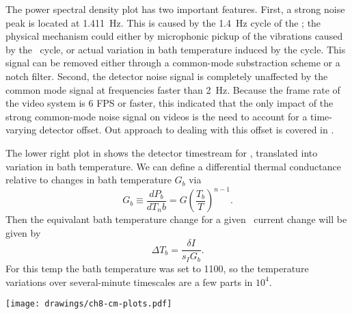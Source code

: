 The power spectral density plot has two important features.
First, a strong noise peak is located at \SI{1.411}{\Hz}.
This is caused by the \abt \SI{1.4}{\Hz} cycle of the \PTC; the physical mechanism could either by microphonic pickup of the vibrations caused by the \PTC\ cycle, or actual variation in bath temperature induced by the cycle.
This signal can be removed either through a common-mode substraction scheme or a notch filter.
Second, the detector noise signal is completely unaffected by the common mode signal at frequencies faster than \SI{2}{\Hz}.
Because the frame rate of the video system is 6 FPS or faster, this indicated that the only impact of the strong common-mode noise signal on videos is the need to account for a time-varying detector offset.
Out approach to dealing with this offset is covered in .

The lower right plot in  shows the detector timestream for , translated into variation in bath temperature.
We can define a differential thermal conductance relative to changes in bath temperature $G_b$ via
\begin{equation}
  G_b \equiv \frac{dP_b}{d T_nb} = G \left( \frac{T_b}{T} \right)^{n-1}.
\end{equation}
Then the equivalant bath temperature change for a given \TES\ current change will be given by
\begin{equation}
  \Delta T_b = \frac{\delta I}{s_I G_b}.
\end{equation}
For this temp the bath temperature was set to \SI{1100}{\mK}, so the temperature variations over several-minute timescales are a few parts in $10^{4}$.

\begin{figure*}
\texttt{[image: drawings/ch8-cm-plots.pdf]}
\caption{Plots summarizing common mode signal and $1/f$ noise.
\textbf{Upper Left}
Plow showing raw detector output for 15 detectors over a 10-minute data acquisition.
Only every 100th data point is plotted, which makes the white noise level appear somewhat smaller than it really is. 
\textbf{Upper Right} 
The same data after removal of the mean signal.
\textbf{Upper Left} 
Current noise power spectral density for the raw data, the raw data minues the common mode (``No CM''), the raw data minus the common modea and the best-fit 4th-order polynomial (``No CM, Poly''), and the common mode itself.
The strong noise peak at \SI{1.411}{\Hz} is due to the \PTC, as explained in the text.
\textbf{Lower Right} 
Raw datastream for , after conversion to a bath temperature variation, as described in the text.
}
\label{fig:ch8-cm-plots}
\end{figure*}

